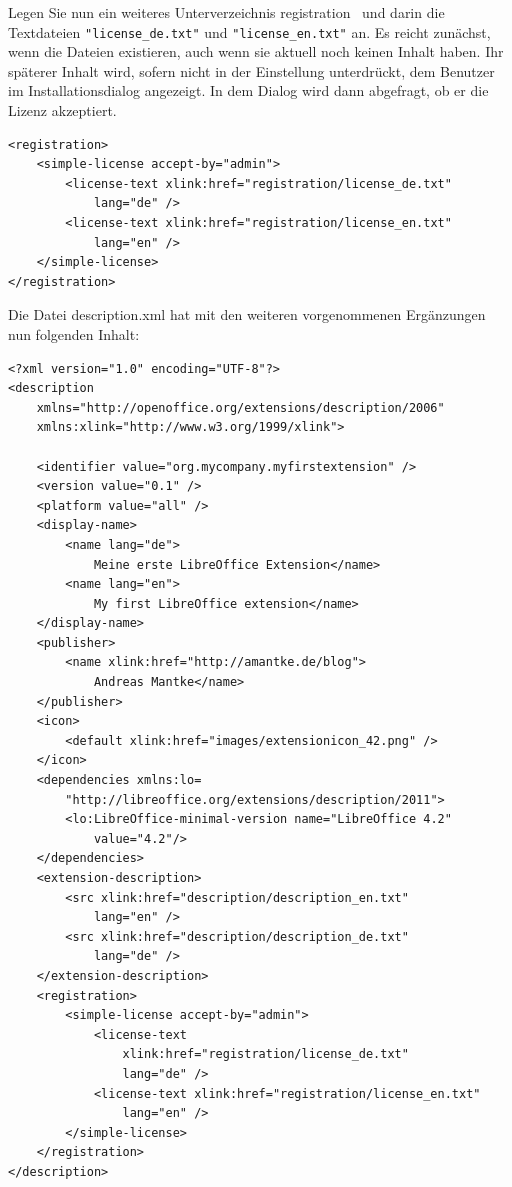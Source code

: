\documentclass[a4paper,10pt,pagesize,titlepage]{scrbook}
\begin{document}
\bigskip
\bigskip
Legen Sie nun ein weiteres Unterverzeichnis \glqq registration\grqq~ und darin die Textdateien \verb|"license_de.txt"| und \verb|"license_en.txt"| an. Es reicht zunächst, wenn die Dateien existieren, auch wenn sie aktuell noch keinen Inhalt haben. Ihr späterer Inhalt wird, sofern nicht in der Einstellung unterdrückt, dem Benutzer im Installationsdialog angezeigt. In dem Dialog wird dann abgefragt, ob er die Lizenz akzeptiert.

\begin{lstlisting}
<registration>
    <simple-license accept-by="admin">
        <license-text xlink:href="registration/license_de.txt" 
            lang="de" />
        <license-text xlink:href="registration/license_en.txt" 
            lang="en" />
    </simple-license>
</registration>
\end{lstlisting}

Die Datei description.xml hat mit den weiteren vorgenommenen Ergänzungen nun folgenden Inhalt:

\begin{lstlisting}
<?xml version="1.0" encoding="UTF-8"?>
<description
    xmlns="http://openoffice.org/extensions/description/2006"
    xmlns:xlink="http://www.w3.org/1999/xlink">

    <identifier value="org.mycompany.myfirstextension" />
    <version value="0.1" />
    <platform value="all" />
    <display-name>
        <name lang="de">
            Meine erste LibreOffice Extension</name>
        <name lang="en">
            My first LibreOffice extension</name>
    </display-name>
    <publisher>
        <name xlink:href="http://amantke.de/blog">
            Andreas Mantke</name>
    </publisher>
    <icon>
        <default xlink:href="images/extensionicon_42.png" />
    </icon>
    <dependencies xmlns:lo=
        "http://libreoffice.org/extensions/description/2011">
        <lo:LibreOffice-minimal-version name="LibreOffice 4.2" 
            value="4.2"/>
    </dependencies>
    <extension-description>
        <src xlink:href="description/description_en.txt" 
            lang="en" />
        <src xlink:href="description/description_de.txt" 
            lang="de" />
    </extension-description>
    <registration>
        <simple-license accept-by="admin">
            <license-text 
                xlink:href="registration/license_de.txt" 
                lang="de" />
            <license-text xlink:href="registration/license_en.txt" 
                lang="en" />
        </simple-license>
    </registration>
</description>

\end{lstlisting}
\end{document}
